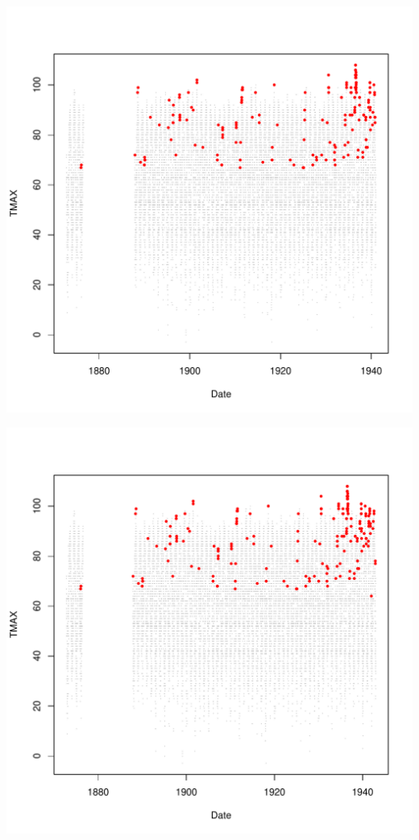 \documentclass{article}\usepackage[]{graphicx}\usepackage[]{color}
\makeatletter
\def\maxwidth{ %
  \ifdim\Gin@nat@width>\linewidth
    \linewidth
  \else
    \Gin@nat@width
  \fi
}
\newenvironment{knitrout}{}{} %
\makeatother
\begin{document}
\begin{knitrout}
\includegraphics[width=\maxwidth]{figure/unnamed-chunk-4-30} 

\includegraphics[width=\maxwidth]{figure/unnamed-chunk-4-31} 


\end{knitrout}
\end{document}
